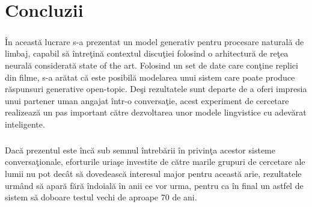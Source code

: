 \chapter{Concluzii}

\paragraph{}
\^ In aceast\u a lucrare s-a prezentat un model generativ pentru procesare natural\u a de limbaj, capabil s\u a \^ intre\c tin\u a contextul discu\c tiei folosind o arhitectur\u a de re\c tea neural\u a considerat\u a state of the art. Folosind un set de date care con\c tine replici din filme, s-a ar\u atat c\u a este posibil\u a modelarea unui sistem care poate produce r\u aspunsuri generative open-topic. De\c si rezultatele sunt departe de a oferi impresia unui partener uman angajat \^ intr-o conversa\c tie, acest experiment de cercetare realizeaz\u a un pas important c\u atre dezvoltarea unor modele lingvistice cu adev\u arat inteligente. 

\paragraph{}
Dac\u a prezentul este \^ inc\u a sub semnul \^ intreb\u arii \^ in privin\c ta acestor sisteme conversa\c tionale, eforturile uria\c se investite de c\u atre marile grupuri de cercetare ale lumii nu pot dec\^ at s\u a dovedeasc\u a interesul major pentru aceast\u a arie, rezultatele urm\^ and s\u a apar\u a f\u ar\u a \^ indoial\u a \^ in anii ce vor urma, pentru ca \^ in final un astfel de sistem s\u a doboare testul vechi de aproape 70 de ani.